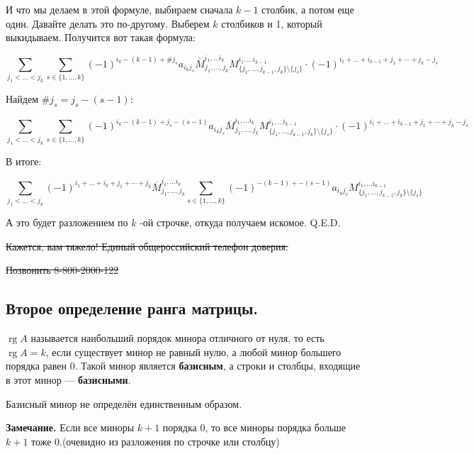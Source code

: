 \documentclass[twoside]{book}
\DeclareMathOperator{\rg}{rg}
\begin{document}
\begin{itemize}
          И что мы делаем в этой формуле, выбираем сначала $k-1$ столбик, а потом еще один. Давайте делать это по-другому. Выберем $k$ столбиков и 1, который выкидываем. Получится вот такая формула:


          \small\[\sum\limits_{j_1<\ldots<j_k} \sum\limits_{s \in \{1,\ldots,k\}} (-1)^{i_k -(k-1) +\# j_s} a_{i_kj_s}\overline{M}_{j_1,\ldots,j_{k}}^{i_1,\ldots i_k} M_{\{j_1,\ldots,j_{k-1}, j_k\}\setminus\{j_s\} }^{i_1,\ldots i_{k-1}} \cdot (-1)^{i_1+ \ldots+i_{k-1} + j_1 + \cdots + j_{k}-j_{s}}\]\normalsize

          Найдем $\#j_s = j_s-(s-1)$:

          \small\[\sum\limits_{j_1<\ldots<j_k} \sum\limits_{s \in \{1,\ldots,k\}} (-1)^{i_k -(k-1) +j_s-(s-1)} a_{i_kj_s}\overline{M}_{j_1,\ldots,j_{k}}^{i_1,\ldots i_k} M_{\{j_1,\ldots,j_{k-1}, j_k\}\setminus\{j_s\}}^{i_1,\ldots i_{k-1}} \cdot (-1)^{i_1+ \ldots+i_{k-1} + j_1 + \cdots + j_{k}-j_{s}}\]\normalsize

          В итоге:

          \small\[\sum\limits_{j_1<\ldots<j_k} (-1)^{i_1+ \ldots+i_{k} + j_1 + \cdots + j_{k}}\overline{M}_{j_1,\ldots,j_{k}}^{i_1,\ldots i_k}\sum\limits_{s \in \{1,\ldots,k\}} (-1)^{ -(k-1) +-(s-1)} a_{i_kj_s} M_{\{j_1,\ldots,j_{k-1}, j_k\}\setminus\{j_s\}}^{i_1,\ldots i_{k-1}}\]\normalsize

          А это будет разложением по $k$ -ой строчке, откуда получаем искомое. Q.E.D.


          \sout{Кажется, вам тяжело! Единый общероссийский телефон доверия:}

          \sout{Позвонить 8-800-2000-122}
\end{itemize}



\subsection{Второе определение ранга матрицы.}



\(\rg A\) называется наибольший порядок минора отличного от нуля, то есть \(\rg A = k\), если существует минор не равный нулю, а любой минор большего порядка равен 0. Такой минор является \textbf{базисным}, а строки и столбцы, входящие в этот минор --- \textbf{базисными}.

Базисный минор не определён единственным образом.

\textbf{Замечание.}  Если все миноры \(k+1\) порядка 0, то все миноры порядка больше \(k+1\) тоже 0.(очевидно из разложения по строчке или столбцу)
\end{document}

